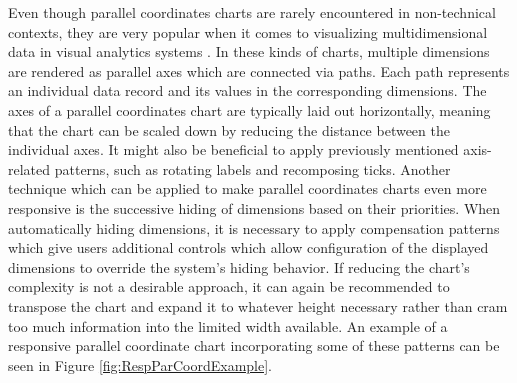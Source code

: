 Even though parallel coordinates charts are rarely encountered in non-technical contexts, they are very popular when it comes to visualizing multidimensional data in visual analytics systems \parencite{HighD}. In these kinds of charts, multiple dimensions are rendered as parallel axes which are connected via paths. Each path represents an individual data record and its values in the corresponding dimensions. The axes of a parallel coordinates chart are typically laid out horizontally, meaning that the chart can be scaled down by reducing the distance between the individual axes. It might also be beneficial to apply previously mentioned axis-related patterns, such as rotating labels and recomposing ticks. Another technique which can be applied to make parallel coordinates charts even more responsive is the successive hiding of dimensions based on their priorities. When automatically hiding dimensions, it is necessary to apply compensation patterns which give users additional controls which allow configuration of the displayed dimensions to override the system's hiding behavior. If reducing the chart's complexity is not a desirable approach, it can again be recommended to transpose the chart and expand it to whatever height necessary rather than cram too much information into the limited width available. An example of a responsive parallel coordinate chart incorporating some of these patterns can be seen in Figure \ref{fig:RespParCoordExample}.

